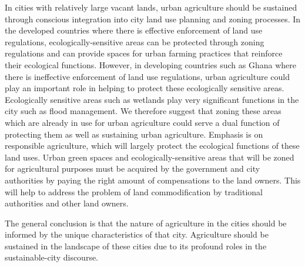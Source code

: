 In cities with relatively large vacant lands, urban agriculture should be sustained through conscious integration into city land use planning and zoning processes. In the developed countries where there is effective enforcement of land use regulations, ecologically-sensitive areas can be protected through zoning regulations and can provide spaces for urban farming practices that reinforce their ecological functions. However, in developing countries such as Ghana where there is ineffective enforcement of land use regulations, urban agriculture could play an important role in helping to protect these ecologically sensitive areas. Ecologically sensitive areas such as wetlands play very significant functions in the city such as flood management. We therefore suggest that zoning these areas which are already in use for urban agriculture could serve a dual function of protecting them as well as sustaining urban agriculture. Emphasis is on responsible agriculture, which will largely protect the ecological functions of these land uses. Urban green spaces and ecologically-sensitive areas that will be zoned for agricultural purposes must be acquired by the government and city authorities by paying the right amount of compensations to the land owners. This will help to address the problem of land commodification by traditional authorities and other land owners.

The general conclusion is that the nature of agriculture in the cities should be informed by the unique characteristics of that city. Agriculture should be sustained in the landscape of these cities due to its profound roles in the sustainable-city discourse.


